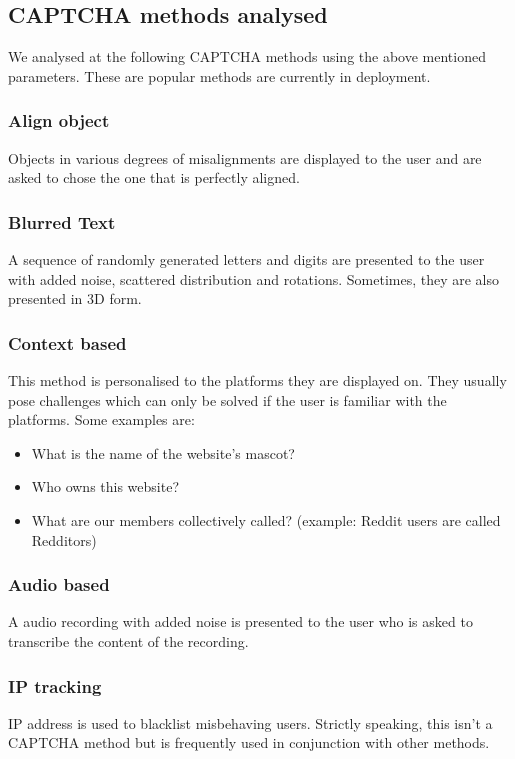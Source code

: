 \subsection{CAPTCHA methods analysed}
We analysed at the following CAPTCHA methods using the above mentioned
parameters. These are popular methods are currently in deployment.

\subsubsection{Align object}
Objects in various degrees of misalignments are displayed to the user and are
asked to chose the one that is perfectly aligned.

\subsubsection{Blurred Text}
A sequence of randomly generated letters and digits are 
		presented to the user with added noise, scattered distribution and
		rotations. Sometimes, they are also presented in 3D form. 

\subsubsection{Context based}
This method is personalised to the platforms they are displayed on. They usually
pose challenges which can only be solved if the user is familiar with the
platforms. Some examples are:
	\begin{itemize}
		\item What is the name of the website's mascot?  
		\item Who owns this website?
		\item What are our members collectively called? (example: Reddit users are
			called Redditors)
	\end{itemize}

\subsubsection{Audio based}
A audio recording with added noise is presented to the user who is asked to
transcribe the content of the recording.

\subsubsection{IP tracking}
IP address is used to blacklist misbehaving users. Strictly speaking, this isn't
a CAPTCHA method but is frequently used in conjunction with other methods.

